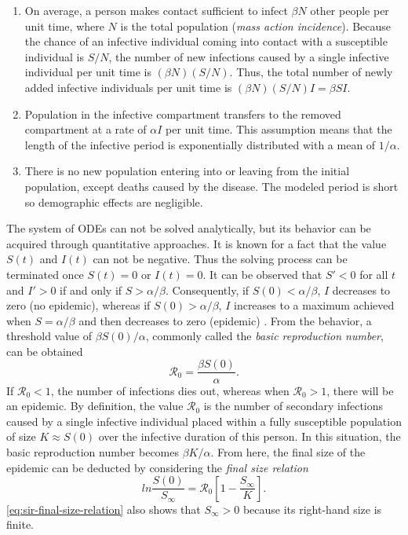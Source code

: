 \begin{enumerate}
    \item On average, a person makes contact sufficient to infect $\beta N$ other people per unit time, where $N$ is the total population (\textit{mass action incidence}).
    Because the chance of an infective individual coming into contact with a susceptible individual is $S / N$, the number of new infections caused by a single infective individual per unit time is $(\beta N) (S / N)$.
    Thus, the total number of newly added infective individuals per unit time is $(\beta N) (S / N) I = \beta S I$.
    \label{assumption:basic-sir-contact-rate}

    \item Population in the infective compartment transfers to the removed compartment at a rate of $\alpha I$ per unit time.
    This assumption means that the length of the infective period is exponentially distributed with a mean of $1 / \alpha$.
    \label{assumption:basic-sir-infective-period}

    \item There is no new population entering into or leaving from the initial population, except deaths caused by the disease.
    The modeled period is short so demographic effects are negligible.
    \label{assumption:basic-sir-constant-population}
\end{enumerate}

The system of \glspl{ODE} can not be solved analytically, but its behavior can be acquired through quantitative approaches.
It is known for a fact that the value $S(t)$ and $I(t)$ can not be negative.
Thus the solving process can be terminated once $S(t) = 0$ or $I(t) = 0$.
It can be observed that $S' < 0$ for all $t$ and $I' > 0$ if and only if $S > \alpha / \beta$.
Consequently, if $S(0) < \alpha / \beta$, $I$ decreases to zero (no epidemic), whereas if $S(0) > \alpha / \beta$, $I$ increases to a maximum achieved when $S = \alpha / \beta$ and then decreases to zero (epidemic) \cite{brauerCompartmentalModelsEpidemiology2008}.
From the behavior, a threshold value of $\beta S(0) / \alpha$, commonly called the \textit{basic reproduction number}, can be obtained
\begin{equation}
    \mathcal{R}_0 = \frac{\beta S(0)}{\alpha}.
\end{equation}
If $\mathcal{R}_0 < 1$, the number of infections dies out, whereas when $\mathcal{R}_0 > 1$, there will be an epidemic.
By definition, the value $\mathcal{R}_0$ is the number of secondary infections caused by a single infective individual placed within a fully susceptible population of size $K \approx S(0)$ over the infective duration of this person.
In this situation, the basic reproduction number becomes $\beta K / \alpha$.
From here, the final size of the epidemic can be deducted by considering the \textit{final size relation} \cite{brauerCompartmentalModelsEpidemiology2008}
\begin{equation}
    ln \frac{S(0)}{S_\infty} = \mathcal{R}_0 \left[ 1 - \frac{S_\infty}{K} \right].
    \label{eq:sir-final-size-relation}
\end{equation}
\autoref{eq:sir-final-size-relation} also shows that $S_\infty > 0$ because its right-hand size is finite.

